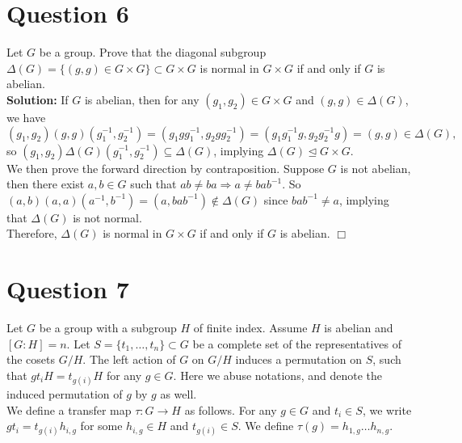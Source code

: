 \documentclass[12pt]{article}
\begin{document}
\section*{Question 6}
Let $G$ be a group. Prove that the diagonal subgroup $\Delta(G) = \{(g,g) \in G \times G\} \subset G \times G$ is normal in $G \times G$ if and only if $G$ is abelian. \\

\noindent \textbf{Solution:} If $G$ is abelian, then for any $(g_1, g_2) \in G \times G$ and $(g, g) \in \Delta(G)$, we have \[(g_1, g_2)(g, g)(g_1^{-1}, g_2^{-1}) = (g_1gg_1^{-1}, g_2gg_2^{-1}) = (g_1g_1^{-1}g, g_2g_2^{-1}g) = (g, g) \in \Delta(G),\] so $(g_1, g_2)\Delta(G)(g_1^{-1}, g_2^{-1}) \subseteq \Delta(G)$, implying $\Delta(G)\unlhd G \times G$. \\

\noindent We then prove the forward direction by contraposition. Suppose $G$ is not abelian, then there exist $a, b \in G$ such that $ab \ne ba \Rightarrow a \ne bab^{-1}$. So $(a, b)(a, a)(a^{-1}, b^{-1}) = (a, bab^{-1}) \notin \Delta(G)$ since $bab^{-1}\ne a$, implying that $\Delta(G)$ is not normal. \\

\noindent Therefore, $\Delta(G)$ is normal in $G \times G$ if and only if $G$ is abelian. \hfill $\Box$

\newpage

\section*{Question 7}
Let $G$ be a group with a subgroup $H$ of finite index. Assume $H$ is abelian and $[G : H] = n$. Let $S = \{t_1,\dots, t_n\} \subset G$ be a complete set of the representatives of the cosets $G/H$. The left
action of $G$ on $G/H$ induces a permutation on $S$, such that $gt_iH
= t_{g(i)}H$ for any $g \in G$. Here we abuse notations, and denote the induced permutation of $g$ by $g$ as well. \\

\noindent We define a transfer map $\tau : G \to H$ as follows. For any $g \in G$ and $t_i \in S$, we write $gt_i = t_{g(i)}h_{i,g}$ for some $h_{i,g} \in H$ and $t_{g(i)} \in S$. We define $\tau(g) = h_{1,g}\dots h_{n,g}$.
\end{document}
